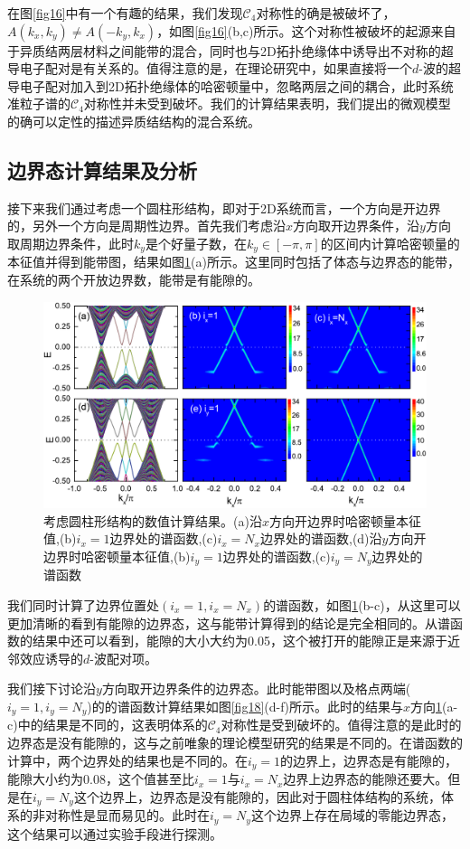 在图\ref{fig16}中有一个有趣的结果，我们发现$\mathcal{C}_4$对称性的确是被破坏了，$A(k_x,k_y)\neq A(-k_y,k_x)$，如图\ref{fig16}(b,c)所示。这个对称性被破坏的起源来自于异质结两层材料之间能带的混合，同时也与2D拓扑绝缘体中诱导出不对称的超导电子配对是有关系的。值得注意的是，在理论研究中，如果直接将一个$d$-波的超导电子配对加入到2D拓扑绝缘体的哈密顿量中，忽略两层之间的耦合，此时系统准粒子谱的$\mathcal{C}_4$对称性并未受到破坏。我们的计算结果表明，我们提出的微观模型的确可以定性的描述异质结结构的混合系统。
\subsection{边界态计算结果及分析}
 接下来我们通过考虑一个圆柱形结构，即对于2D系统而言，一个方向是开边界的，另外一个方向是周期性边界。首先我们考虑沿$x$方向取开边界条件，沿$y$方向取周期边界条件，此时$k_y$是个好量子数，在$k_y\in\left[-\pi,\pi\right]$的区间内计算哈密顿量的本征值并得到能带图，结果如图\ref{fig17}(a)所示。这里同时包括了体态与边界态的能带，在系统的两个开放边界数，能带是有能隙的。
\begin{figure}[h]
	\centering
	\includegraphics[scale=0.7]{pic/fig18.pdf}
	\caption{考虑圆柱形结构的数值计算结果。(a)沿$x$方向开边界时哈密顿量本征值,(b)$i_x=1$边界处的谱函数,(c)$i_x=N_x$边界处的谱函数,(d)沿$y$方向开边界时哈密顿量本征值,(b)$i_y=1$边界处的谱函数,(c)$i_y=N_y$边界处的谱函数}\label{fig17}
\end{figure}
我们同时计算了边界位置处$(i_x=1,i_x=N_x)$的谱函数，如图\ref{fig17}(b-c)，从这里可以更加清晰的看到有能隙的边界态，这与能带计算得到的结论是完全相同的。从谱函数的结果中还可以看到，能隙的大小大约为0.05，这个被打开的能隙正是来源于近邻效应诱导的$d$-波配对项\cite{re27,re28}。

 我们接下讨论沿$y$方向取开边界条件的边界态。此时能带图以及格点两端($i_y=1,i_y=N_y$)的的谱函数计算结果如图\ref{fig18}(d-f)所示。此时的结果与$x$方向\ref{fig17}(a-c)中的结果是不同的，这表明体系的$\mathcal{C}_4$对称性是受到破坏的。值得注意的是此时的边界态是没有能隙的，这与之前唯象的理论模型研究的结果是不同的\cite{re27,re28}。在谱函数的计算中，两个边界处的结果也是不同的。在$i_y=1$的边界上，边界态是有能隙的，能隙大小约为0.08，这个值甚至比$i_x=1$与$i_x=N_x$边界上边界态的能隙还要大。但是在$i_y=N_y$这个边界上，边界态是没有能隙的，因此对于圆柱体结构的系统，体系的非对称性是显而易见的。此时在$i_y=N_y$这个边界上存在局域的零能边界态，这个结果可以通过实验手段进行探测。
